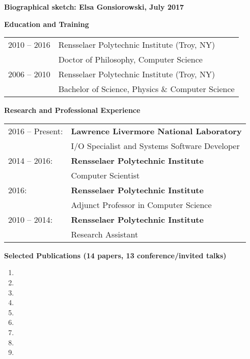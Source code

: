 \documentclass[times,11pt]{article}    %
\begin{document}
\begin{center}
\textbf{\sffamily\large Biographical sketch: Elsa Gonsiorowski, July 2017}
\end{center}

\vskip 3pt
\textbf{\sffamily Education and Training}
\vskip 3pt

\begin{tabular}{ll}
\\
2010 -- 2016 & Rensselaer Polytechnic Institute (Troy, NY)\\
             & Doctor of Philosophy, Computer Science\\
2006 -- 2010 & Rensselaer Polytechnic Institute (Troy, NY)\\
             & Bachelor of Science, Physics \& Computer Science\\
\end{tabular}

\vskip 3pt
\textbf{\sffamily Research and Professional Experience}
\vskip 3pt

\begin{tabular}{ll}
2016 -- Present: & 
\textbf{Lawrence Livermore National Laboratory}\\
 & I/O Specialist and Systems Software Developer \\

2014 -- 2016: &
\textbf{Rensselaer Polytechnic Institute}\\
 & Computer Scientist \\

2016: & 
\textbf{Rensselaer Polytechnic Institute}\\
 & Adjunct Professor in Computer Science \\

2010 -- 2014: & 
\textbf{Rensselaer Polytechnic Institute}\\
 & Research Assistant \\
\end{tabular}

\vskip 3pt
\textbf{\sffamily Selected Publications (14 papers, 13 conference/invited talks)}

\begin{enumerate}
\item {}
\item {}
\item {}
\item {}
\item {}
\item {}
\item {}
\item {}
\item {}
\end{enumerate}
\end{document}
